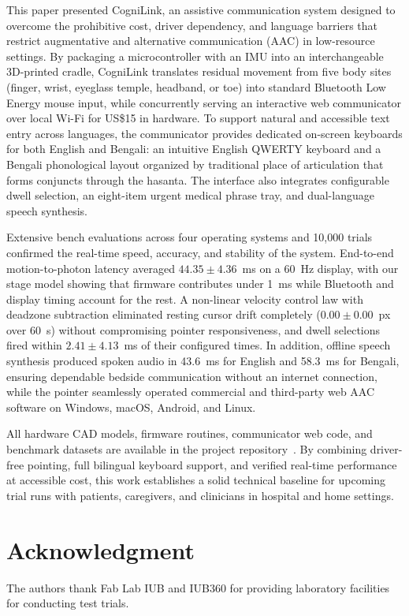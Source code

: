 \documentclass[journal]{IEEEtran}
\begin{document}
This paper presented CogniLink, an assistive communication system designed to overcome the prohibitive cost, driver dependency, and language barriers that restrict augmentative and alternative communication (AAC) in low-resource settings. By packaging a microcontroller with an IMU into an interchangeable 3D-printed cradle, CogniLink translates residual movement from five body sites (finger, wrist, eyeglass temple, headband, or toe) into standard Bluetooth Low Energy mouse input, while concurrently serving an interactive web communicator over local Wi-Fi for US\$15 in hardware. To support natural and accessible text entry across languages, the communicator provides dedicated on-screen keyboards for both English and Bengali: an intuitive English QWERTY keyboard and a Bengali phonological layout organized by traditional place of articulation that forms conjuncts through the hasanta. The interface also integrates configurable dwell selection, an eight-item urgent medical phrase tray, and dual-language speech synthesis.

Extensive bench evaluations across four operating systems and 10,000 trials confirmed the real-time speed, accuracy, and stability of the system. End-to-end motion-to-photon latency averaged $44.35\pm4.36$~ms on a 60~Hz display, with our stage model showing that firmware contributes under 1~ms while Bluetooth and display timing account for the rest. A non-linear velocity control law with deadzone subtraction eliminated resting cursor drift completely ($0.00\pm0.00$~px over 60~s) without compromising pointer responsiveness, and dwell selections fired within $2.41\pm4.13$~ms of their configured times. In addition, offline speech synthesis produced spoken audio in 43.6~ms for English and 58.3~ms for Bengali, ensuring dependable bedside communication without an internet connection, while the pointer seamlessly operated commercial and third-party web AAC software on Windows, macOS, Android, and Linux.

All hardware CAD models, firmware routines, communicator web code, and benchmark datasets are available in the project repository~\cite{cognilink_repo}. By combining driver-free pointing, full bilingual keyboard support, and verified real-time performance at accessible cost, this work establishes a solid technical baseline for upcoming trial runs with patients, caregivers, and clinicians in hospital and home settings.

\section*{Acknowledgment}
The authors thank Fab Lab IUB and IUB360 for providing laboratory facilities for conducting test trials.
\end{document}
